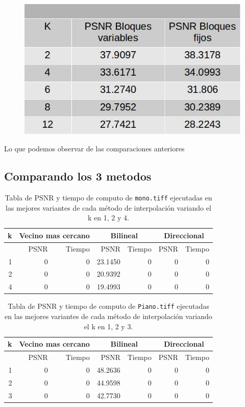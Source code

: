 \documentclass[a4paper]{article}
\newcounter{col}
\begin{document}
    
     \begin{figure}[H]
    \centering
    \includegraphics[scale=0.4]{imagenes/autoMetodosDif.jpg}
	\label{autoe}
    \end{figure}

Lo que podemos observar de las comparaciones anteriores

\subsection{Comparando los 3 metodos}

\begin{table}[H]
\centering
\begin{tabular}{|r|r|r|r|r|r|r|}
\hline
\multicolumn{1}{|c|}{k} & \multicolumn{2}{|c|}{Vecino mas cercano} & \multicolumn{2}{|c|}{Bilineal} & \multicolumn{2}{|c|}{Direccional} \\ \hline
  & PSNR & Tiempo & PSNR & Tiempo & PSNR & Tiempo \\ \hline
1 & 0 & 0 & 23.1450 & 0 &  0 & 0 \\ \hline
2 & 0 & 0 & 20.9392 & 0 &  0 & 0 \\ \hline
4 & 0 & 0 & 19.4993 & 0 &  0 & 0 \\ \hline
\end{tabular}
\caption{Tabla de PSNR y tiempo de computo de \texttt{mono.tiff} ejecutadas en las mejores variantes de cada m\'etodo de interpolaci\'on variando el k en 1, 2 y 4.}
\label{}
\end{table}


\begin{table}[H]
\centering
\begin{tabular}{|r|r|r|r|r|r|r|}
\hline
\multicolumn{1}{|c|}{k} & \multicolumn{2}{|c|}{Vecino mas cercano} & \multicolumn{2}{|c|}{Bilineal} & \multicolumn{2}{|c|}{Direccional} \\ \hline
  & PSNR & Tiempo & PSNR & Tiempo & PSNR & Tiempo \\ \hline
1 & 0 & 0 & 48.2636 & 0 &  0 & 0 \\ \hline
2 & 0 & 0 & 44.9598 & 0 &  0 & 0 \\ \hline
3 & 0 & 0 & 42.7730 & 0 &  0 & 0 \\ \hline
\end{tabular}
\caption{Tabla de PSNR y tiempo de computo de \texttt{Piano.tiff} ejecutadas en las mejores variantes de cada m\'etodo de interpolaci\'on variando el k en 1, 2 y 3.}
\label{}
\end{table}
\end{document}
